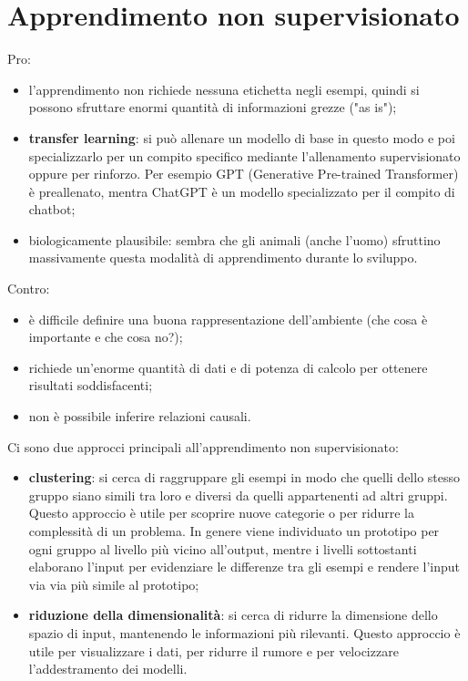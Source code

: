 \section{Apprendimento non supervisionato}

Pro:
\begin{itemize}
	\item l'apprendimento non richiede nessuna etichetta negli esempi, quindi si
		possono sfruttare enormi quantità di informazioni grezze ("as is");

	\item \textbf{transfer learning}: si può allenare un modello di base in
		questo modo e poi specializzarlo per un compito specifico mediante
		l'allenamento supervisionato oppure per rinforzo. Per esempio GPT
		(Generative Pre-trained Transformer) è preallenato, mentra ChatGPT è un
		modello specializzato per il compito di chatbot;

	\item biologicamente plausibile: sembra che gli animali (anche l'uomo)
		sfruttino massivamente questa modalità di apprendimento durante lo 
		sviluppo.
\end{itemize}

Contro:
\begin{itemize}
	\item è difficile definire una buona rappresentazione dell'ambiente
		(che cosa è importante e che cosa no?);

	\item richiede un'enorme quantità di dati e di potenza di calcolo per
		ottenere risultati soddisfacenti;

	\item non è possibile inferire relazioni causali.
\end{itemize}

Ci sono due approcci principali all'apprendimento non supervisionato:
\begin{itemize}
	\item \textbf{clustering}: si cerca di raggruppare gli esempi in modo che
		quelli dello stesso gruppo siano simili tra loro e diversi da quelli
		appartenenti ad altri gruppi. Questo approccio è utile per scoprire
		nuove categorie o per ridurre la complessità di un problema. In genere
		viene individuato un prototipo per ogni gruppo al livello più vicino
		all'output, mentre i livelli sottostanti elaborano l'input per
		evidenziare le differenze tra gli esempi e rendere l'input via via più
		simile al prototipo;

	\item \textbf{riduzione della dimensionalità}: si cerca di ridurre la
		dimensione dello spazio di input, mantenendo le informazioni più
		rilevanti. Questo approccio è utile per visualizzare i dati, per
		ridurre il rumore e per velocizzare l'addestramento dei modelli.
\end{itemize}

